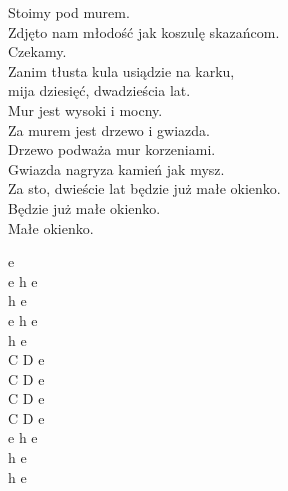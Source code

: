 \begin{text}
    Stoimy pod murem.\\
    Zdjęto nam młodość jak koszulę skazańcom.\\
    Czekamy.\\
    Zanim tłusta kula usiądzie na karku,\\
    mija dziesięć, dwadzieścia lat.\\
    Mur jest wysoki i mocny.\\
    Za murem jest drzewo i gwiazda.\\
    Drzewo podważa mur korzeniami.\\
    Gwiazda nagryza kamień jak mysz.\\
    Za sto, dwieście lat będzie już małe okienko.\\
    Będzie już małe okienko.\\
    Małe okienko.
\end{text}
\begin{chord}
    e\\
    e h e\\
    h e\\
    e h e\\
    h e\\
    C D e\\
    C D e\\
    C D e\\
    C D e\\
    e h e\\
    h e\\
    h e
\end{chord}
